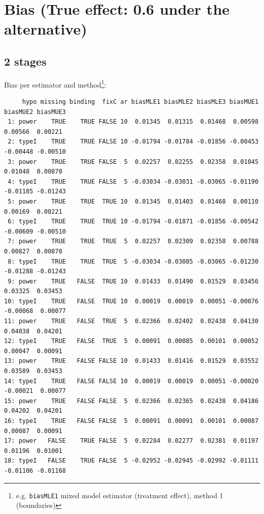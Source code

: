 \documentclass[12pt]{article}
\begin{document}
\clearpage

\section{Bias (True effect: 0.6 under the alternative)}
\label{sec:org552c1f2}

\subsection{2 stages}
\label{sec:orgee86737}
Bias per estimator and method\footnote{e.g. \texttt{biasMLE1} mixed model
estimator (treatment effect), method 1 (boundaries)}:
\begin{adjustwidth}{-1cm}{-1cm}
\begin{verbatim}
     hypo missing binding  fixC ar biasMLE1 biasMLE2 biasMLE3 biasMUE1 biasMUE2 biasMUE3
 1: power    TRUE    TRUE FALSE 10  0.01345  0.01315  0.01468  0.00598  0.00566  0.00221
 2: typeI    TRUE    TRUE FALSE 10 -0.01794 -0.01784 -0.01856 -0.00453 -0.00448 -0.00510
 3: power    TRUE    TRUE FALSE  5  0.02257  0.02255  0.02358  0.01045  0.01048  0.00870
 4: typeI    TRUE    TRUE FALSE  5 -0.03034 -0.03031 -0.03065 -0.01190 -0.01185 -0.01243
 5: power    TRUE    TRUE  TRUE 10  0.01345  0.01403  0.01468  0.00110  0.00169  0.00221
 6: typeI    TRUE    TRUE  TRUE 10 -0.01794 -0.01871 -0.01856 -0.00542 -0.00609 -0.00510
 7: power    TRUE    TRUE  TRUE  5  0.02257  0.02309  0.02358  0.00788  0.00827  0.00870
 8: typeI    TRUE    TRUE  TRUE  5 -0.03034 -0.03085 -0.03065 -0.01230 -0.01288 -0.01243
 9: power    TRUE   FALSE  TRUE 10  0.01433  0.01490  0.01529  0.03456  0.03325  0.03453
10: typeI    TRUE   FALSE  TRUE 10  0.00019  0.00019  0.00051 -0.00076 -0.00068  0.00077
11: power    TRUE   FALSE  TRUE  5  0.02366  0.02402  0.02438  0.04130  0.04038  0.04201
12: typeI    TRUE   FALSE  TRUE  5  0.00091  0.00085  0.00101  0.00052  0.00047  0.00091
13: power    TRUE   FALSE FALSE 10  0.01433  0.01416  0.01529  0.03552  0.03589  0.03453
14: typeI    TRUE   FALSE FALSE 10  0.00019  0.00019  0.00051 -0.00020 -0.00021  0.00077
15: power    TRUE   FALSE FALSE  5  0.02366  0.02365  0.02438  0.04186  0.04202  0.04201
16: typeI    TRUE   FALSE FALSE  5  0.00091  0.00091  0.00101  0.00087  0.00087  0.00091
17: power   FALSE    TRUE FALSE  5  0.02284  0.02277  0.02381  0.01197  0.01196  0.01001
18: typeI   FALSE    TRUE FALSE  5 -0.02952 -0.02945 -0.02992 -0.01111 -0.01106 -0.01168
\end{verbatim}
\end{adjustwidth}
\end{document}
